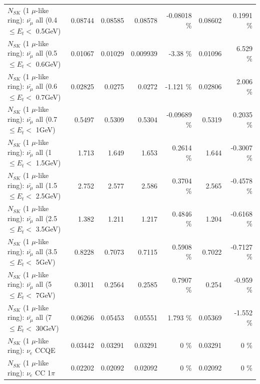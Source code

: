 \begin{table}
\begin{tabular}{| l | r | r | r  r | r  r |}
 $N_{SK}$ (1 $\mu$-like ring): $\bar{\nu_{\mu}}$ all (0.4 $\leq E_{t} <$ 0.5GeV) &         0.08744 &         0.08585 &         0.08578 & -0.08018 \%  &         0.08602 &   0.1991 \%  \\ 
 $N_{SK}$ (1 $\mu$-like ring): $\bar{\nu_{\mu}}$ all (0.5 $\leq E_{t} <$ 0.6GeV) &         0.01067 &         0.01029 &        0.009939 &    -3.38 \%  &         0.01096 &    6.529 \%  \\ 
 $N_{SK}$ (1 $\mu$-like ring): $\bar{\nu_{\mu}}$ all (0.6 $\leq E_{t} <$ 0.7GeV) &         0.02825 &          0.0275 &          0.0272 &   -1.121 \%  &         0.02806 &    2.006 \%  \\ 
   $N_{SK}$ (1 $\mu$-like ring): $\bar{\nu_{\mu}}$ all (0.7 $\leq E_{t} <$ 1GeV) &          0.5497 &          0.5309 &          0.5304 & -0.09689 \%  &          0.5319 &   0.2035 \%  \\ 
   $N_{SK}$ (1 $\mu$-like ring): $\bar{\nu_{\mu}}$ all (1 $\leq E_{t} <$ 1.5GeV) &           1.713 &           1.649 &           1.653 &   0.2614 \%  &           1.644 &  -0.3007 \%  \\ 
 $N_{SK}$ (1 $\mu$-like ring): $\bar{\nu_{\mu}}$ all (1.5 $\leq E_{t} <$ 2.5GeV) &           2.752 &           2.577 &           2.586 &   0.3704 \%  &           2.565 &  -0.4578 \%  \\ 
 $N_{SK}$ (1 $\mu$-like ring): $\bar{\nu_{\mu}}$ all (2.5 $\leq E_{t} <$ 3.5GeV) &           1.382 &           1.211 &           1.217 &   0.4846 \%  &           1.204 &  -0.6168 \%  \\ 
   $N_{SK}$ (1 $\mu$-like ring): $\bar{\nu_{\mu}}$ all (3.5 $\leq E_{t} <$ 5GeV) &          0.8228 &          0.7073 &          0.7115 &   0.5908 \%  &          0.7022 &  -0.7127 \%  \\ 
     $N_{SK}$ (1 $\mu$-like ring): $\bar{\nu_{\mu}}$ all (5 $\leq E_{t} <$ 7GeV) &          0.3011 &          0.2564 &          0.2585 &   0.7907 \%  &           0.254 &   -0.959 \%  \\ 
    $N_{SK}$ (1 $\mu$-like ring): $\bar{\nu_{\mu}}$ all (7 $\leq E_{t} <$ 30GeV) &         0.06266 &         0.05453 &         0.05551 &    1.793 \%  &         0.05369 &   -1.552 \%  \\ 
\hline
\hline
\hline
                                      $N_{SK}$ (1 $\mu$-like ring): $\nu_e$ CCQE &         0.03442 &         0.03291 &         0.03291 &        0 \%  &         0.03291 &        0 \%  \\ 
                                 $N_{SK}$ (1 $\mu$-like ring): $\nu_e$ CC 1$\pi$ &         0.02202 &         0.02092 &         0.02092 &        0 \%  &         0.02092 &        0 \%  \\ 

\end{tabular}
\end{table}
